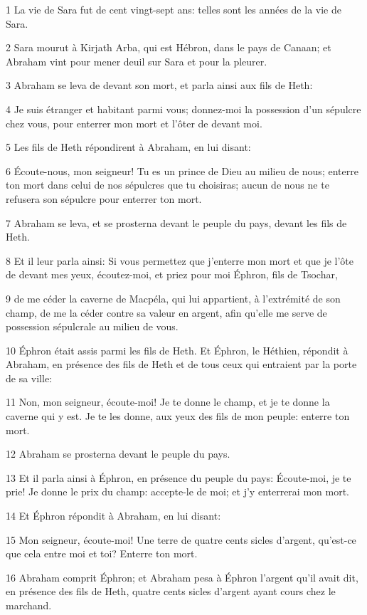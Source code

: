 \par 1 La vie de Sara fut de cent vingt-sept ans: telles sont les années de la vie de Sara.
\par 2 Sara mourut à Kirjath Arba, qui est Hébron, dans le pays de Canaan; et Abraham vint pour mener deuil sur Sara et pour la pleurer.
\par 3 Abraham se leva de devant son mort, et parla ainsi aux fils de Heth:
\par 4 Je suis étranger et habitant parmi vous; donnez-moi la possession d'un sépulcre chez vous, pour enterrer mon mort et l'ôter de devant moi.
\par 5 Les fils de Heth répondirent à Abraham, en lui disant:
\par 6 Écoute-nous, mon seigneur! Tu es un prince de Dieu au milieu de nous; enterre ton mort dans celui de nos sépulcres que tu choisiras; aucun de nous ne te refusera son sépulcre pour enterrer ton mort.
\par 7 Abraham se leva, et se prosterna devant le peuple du pays, devant les fils de Heth.
\par 8 Et il leur parla ainsi: Si vous permettez que j'enterre mon mort et que je l'ôte de devant mes yeux, écoutez-moi, et priez pour moi Éphron, fils de Tsochar,
\par 9 de me céder la caverne de Macpéla, qui lui appartient, à l'extrémité de son champ, de me la céder contre sa valeur en argent, afin qu'elle me serve de possession sépulcrale au milieu de vous.
\par 10 Éphron était assis parmi les fils de Heth. Et Éphron, le Héthien, répondit à Abraham, en présence des fils de Heth et de tous ceux qui entraient par la porte de sa ville:
\par 11 Non, mon seigneur, écoute-moi! Je te donne le champ, et je te donne la caverne qui y est. Je te les donne, aux yeux des fils de mon peuple: enterre ton mort.
\par 12 Abraham se prosterna devant le peuple du pays.
\par 13 Et il parla ainsi à Éphron, en présence du peuple du pays: Écoute-moi, je te prie! Je donne le prix du champ: accepte-le de moi; et j'y enterrerai mon mort.
\par 14 Et Éphron répondit à Abraham, en lui disant:
\par 15 Mon seigneur, écoute-moi! Une terre de quatre cents sicles d'argent, qu'est-ce que cela entre moi et toi? Enterre ton mort.
\par 16 Abraham comprit Éphron; et Abraham pesa à Éphron l'argent qu'il avait dit, en présence des fils de Heth, quatre cents sicles d'argent ayant cours chez le marchand.
